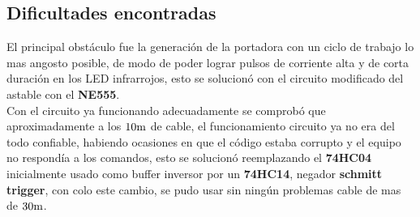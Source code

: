 
\subsection{Dificultades encontradas}

El principal obstáculo fue la generación de la portadora con un ciclo de trabajo lo mas angosto posible, de modo de poder lograr pulsos de corriente alta y de corta duración en los LED infrarrojos, esto se solucionó con el circuito modificado del astable con el \textbf{NE555}. \\

Con el circuito ya funcionando adecuadamente se comprobó que aproximadamente a los  $10 \si[per-mode=symbol]{\meter}$ de cable, el funcionamiento circuito ya no era del todo confiable, habiendo ocasiones en que el código estaba corrupto y el equipo no respondía a los comandos, esto se solucionó reemplazando el \textbf{74HC04} inicialmente usado como buffer inversor por un \textbf{74HC14}, negador \textbf{schmitt trigger}, con colo este cambio, se pudo usar sin ningún problemas cable de mas de $30 \si[per-mode=symbol]{\meter}$.

